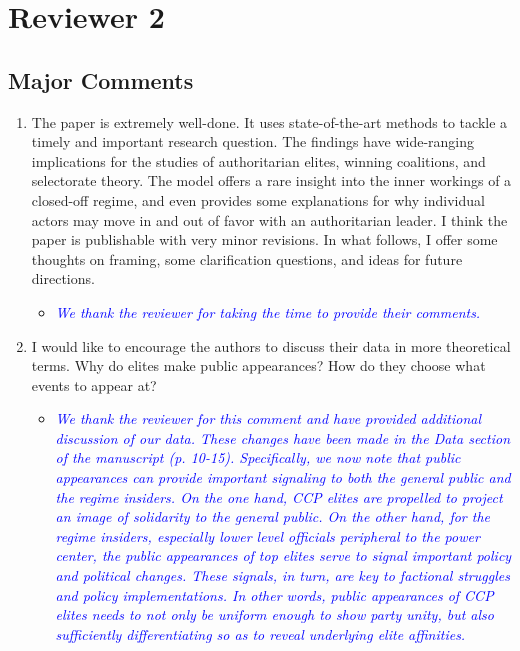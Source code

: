 \section*{Reviewer 2}

\subsection*{Major Comments}

\begin{enumerate}
	\item The paper is extremely well-done.  It uses state-of-the-art methods to tackle a timely and important research question. The findings have wide-ranging implications for the studies of authoritarian elites, winning coalitions, and selectorate theory.  The model offers a rare insight into the inner workings of a closed-off regime, and even provides some explanations for why individual actors may move in and out of favor with an authoritarian leader.  I think the paper is publishable with very minor revisions. In what follows, I offer some thoughts on framing, some clarification questions, and ideas for future directions.
	\begin{itemize}
		\item \textcolor{blue}{ \emph{
		We thank the reviewer for taking the time to provide their comments.
		}}
	\end{itemize}
	\item I would like to encourage the authors to discuss their data in more theoretical terms.  Why do elites make public appearances? How do they choose what events to appear at?
		\begin{itemize}
		\item \textcolor{blue}{ \emph{
			We thank the reviewer for this comment and have provided additional discussion of our data. These changes have been made in the Data section of the manuscript (p. 10-15).  Specifically, we now note that public appearances can provide important signaling to both the general public and the regime insiders.  On the one hand, CCP elites are propelled to project an image of solidarity to the general public.  On the other hand, for the regime insiders, especially lower level officials peripheral to the power center, the public appearances of top elites serve to signal important policy and political changes. These signals, in turn, are key to factional struggles and policy implementations.   In other words, public appearances of CCP elites needs to not only be uniform enough to show party unity, but also sufficiently differentiating so as to reveal underlying elite affinities.
			}}
	\end{itemize}


\end{enumerate}

